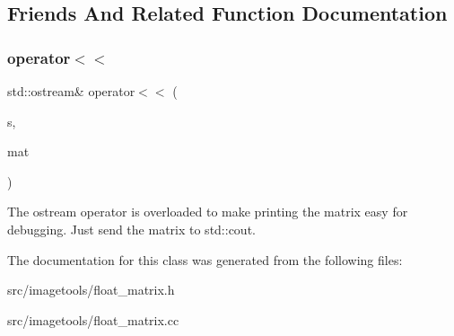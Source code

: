 \subsection{Friends And Related Function Documentation}
\mbox{\label{classimage__tools_1_1FloatMatrix_aa20d6a194db78bcaf737647f7c89baee}} 
\subsubsection{\texorpdfstring{operator$<$$<$}{operator<<}}
{\footnotesize\ttfamily std\+::ostream\& operator$<$$<$ (\begin{DoxyParamCaption}\item[{std\+::ostream \&}]{s,  }\item[{const \hyperlink{classimage__tools_1_1FloatMatrix}{Float\+Matrix} \&}]{mat }\end{DoxyParamCaption})\hspace{0.3cm}{\ttfamily [friend]}}

The ostream operator is overloaded to make printing the matrix easy for debugging. Just send the matrix to std\+::cout. 

The documentation for this class was generated from the following files\+:\begin{DoxyCompactItemize}
\item 
src/imagetools/float\+\_\+matrix.\+h\item 
src/imagetools/float\+\_\+matrix.\+cc\end{DoxyCompactItemize}
